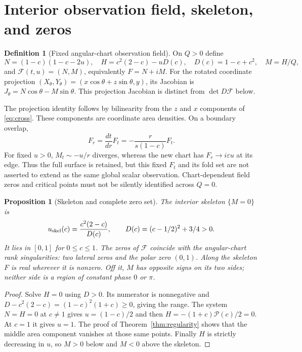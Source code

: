 \documentclass[11pt,a4paper]{article}
\newtheorem{proposition}[theorem]{Proposition}
\theoremstyle{definition}\newtheorem{definition}[theorem]{Definition}
\theoremstyle{remark}\newtheorem{remark}[theorem]{Remark}
\newcommand{\Map}{\mathcal F}\newcommand{\Pcore}{\mathcal P}
\begin{document}
\section{Interior observation field, skeleton, and zeros}
\begin{definition}[Fixed angular-chart observation field]\label{def:observation}
On $Q>0$ define
\[
 N=(1-c)(1-c-2u),\quad H=c^2(2-c)-uD(c),\quad
 D(c)=1-c+c^2,\quad M=H/Q,
\]
and $\Map(t,u)=(N,M)$, equivalently $F=N+iM$.
For the rotated coordinate projection $(X_\theta,Y_\theta)
=(x\cos\theta+z\sin\theta,y)$, its Jacobian is
$J_\theta=N\cos\theta-M\sin\theta$.
This projection Jacobian is distinct from $\det D\Map$ below.
\end{definition}
The projection identity follows by bilinearity from the $z$ and $x$
components of \eqref{eq:cross}. These components are coordinate area
densities. On a boundary overlap,
\begin{equation}\label{eq:field-transform}
 F_r=\frac{dt}{dr}F_t=-\frac{r}{s(1-c)}F_t.
\end{equation}
For fixed $u>0$, $M_t\sim-u/r$ diverges, whereas the new chart has
$F_r\longrightarrow i\varepsilon u$ at its edge. Thus the full surface
is retained, but this fixed $F_t$ and its fold set are not asserted to
extend as the same global scalar observation. Chart-dependent field
zeros and critical points must not be silently identified across $Q=0$.

\begin{proposition}[Skeleton and complete zero set]\label{prop:zeros}
The interior skeleton $\{M=0\}$ is
\[
 u_{\rm skel}(c)=\frac{c^2(2-c)}{D(c)},\qquad
 D(c)=(c-1/2)^2+3/4>0.
\]
It lies in $[0,1]$ for $0\leq c\leq1$. The zeros of $\Map$ coincide
with the angular-chart rank singularities: two lateral zeros and the
polar zero $(0,1)$. Along the skeleton $F$ is real wherever it is
nonzero. Off it, $M$ has opposite signs on its two sides; neither side
is a region of constant phase $0$ or $\pi$.
\end{proposition}
\begin{proof}
Solve $H=0$ using $D>0$. Its numerator is nonnegative and
$D-c^2(2-c)=(1-c)^2(1+c)\geq0$, giving the range.
The system $N=H=0$ at $c\ne1$ gives $u=(1-c)/2$ and then
$H=-(1+c)\Pcore(c)/2=0$. At $c=1$ it gives $u=1$.
The proof of Theorem~\ref{thm:regularity} shows that the middle area
component vanishes at those same points. Finally $H$ is strictly
decreasing in $u$, so $M>0$ below and $M<0$ above the skeleton.
\end{proof}
\end{document}
